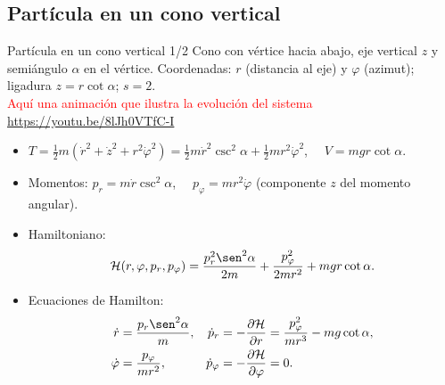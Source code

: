 \documentclass[spanish]{beamer}
\newcommand{\Ham}{\mathcal{H}}               %
\newcommand{\pd}[2]{\frac{\partial #1}{\partial #2}}
\begin{document}
\subsection{Partícula en un cono vertical}
\begin{frame}{Partícula en un cono vertical 1/2}
\small
Cono con vértice hacia abajo, eje vertical $z$ y semiángulo $\alpha$ en el vértice.
Coordenadas: $r$ (distancia al eje) y $\varphi$ (azimut); ligadura $z=r\cot\alpha$; $s=2$. \\
{ \tiny \textcolor{red}{Aqu\'i una animaci\'on que ilustra la evoluci\'on del sistema \url{https://youtu.be/8lJh0VTfC-I}}}
\par\normalsize
\begin{itemize}[<+->]
  \item $T=\tfrac12 m(\dot r^2+\dot z^2+r^2\dot\varphi^2)
          =\tfrac12 m\dot r^2\csc^2\alpha+\tfrac12 mr^2\dot\varphi^2$,
        $\quad V=mgr\cot\alpha$.
  \item Momentos: $p_r=m\dot r\csc^2\alpha$, $\quad p_\varphi=mr^2\dot\varphi$
        (componente $z$ del momento angular).
  \item Hamiltoniano:
        \[
          \Ham(r,\varphi,p_r,p_\varphi)=\frac{p_r^2\sen^2\alpha}{2m}
          +\frac{p_\varphi^2}{2mr^2}+mgr\cot\alpha .
        \]
  \item Ecuaciones de Hamilton:
        \begin{align*}
          \dot r&=\frac{p_r\sen^2\alpha}{m}, &
          \dot p_r&=-\pd{\Ham}{r}=\frac{p_\varphi^2}{mr^3}-mg\cot\alpha,\\
          \dot\varphi&=\frac{p_\varphi}{mr^2}, &
          \dot p_\varphi&=-\pd{\Ham}{\varphi}=0 .
        \end{align*}
\end{itemize}
\end{frame}
\end{document}
